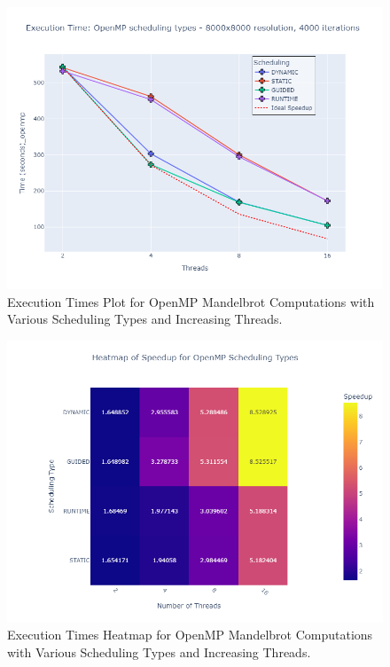 \documentclass[
	report, %
	11pt, %
]{CSUniSchoolLabReport}
\begin{document}
\begin{figure}[H]
	\centering
	\captionsetup{justification=centering, width=.8\linewidth}
	\includegraphics[width=\textwidth]{./img/mandelbrot_openmp_scheduling_types_plot.png}
	\caption{Execution Times Plot for OpenMP Mandelbrot Computations with Various Scheduling Types and Increasing Threads.}
	\label{fig:mandelbrot_openMP_scheduling_types_speedup}
\end{figure}

\begin{figure}[H]
	\centering
	\captionsetup{justification=centering, width=.8\linewidth}
	\includegraphics[width=\textwidth]{./img/mandelbrot_openMP_scheduling_types_heatmap_speedup.png}
	\caption{Execution Times Heatmap for OpenMP Mandelbrot Computations with Various Scheduling Types and Increasing Threads.}
	\label{fig:mandelbrot_openMP_scheduling_types_heatmap_speedup}
\end{figure}
\end{document}

